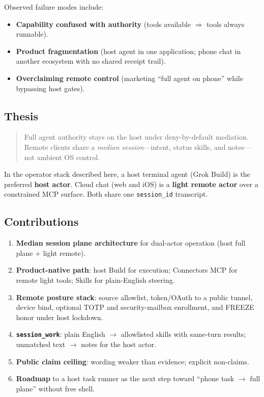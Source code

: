 \documentclass[11pt,a4paper]{article}
\begin{document}
Observed failure modes include:

\begin{itemize}[leftmargin=*]
  \item \textbf{Capability confused with authority}
        (tools available $\Rightarrow$ tools always runnable).
  \item \textbf{Product fragmentation}
        (host agent in one application; phone chat in another ecosystem with no
        shared receipt trail).
  \item \textbf{Overclaiming remote control}
        (marketing ``full agent on phone'' while bypassing host gates).
\end{itemize}

\subsection{Thesis}

\begin{quote}
Full agent authority stays on the host under deny-by-default mediation.
Remote clients share a \emph{median session}---intent, status skills, and
notes---not ambient OS control.
\end{quote}

In the operator stack described here, a host terminal agent (Grok Build) is the
preferred \textbf{host actor}. Cloud chat (web and iOS) is a \textbf{light remote
actor} over a constrained MCP surface. Both share one \texttt{session\_id}
transcript.

\subsection{Contributions}

\begin{enumerate}[leftmargin=*]
  \item \textbf{Median session plane architecture} for dual-actor operation
        (host full plane + light remote).
  \item \textbf{Product-native path}: host Build for execution; Connectors MCP for
        remote light tools; Skills for plain-English steering.
  \item \textbf{Remote posture stack}: source allowlist, token/OAuth to a public
        tunnel, device bind, optional TOTP and security-mailbox enrollment, and
        FREEZE honor under host lockdown.
  \item \textbf{\texttt{session\_work}}: plain English $\rightarrow$ allowlisted
        skills with same-turn results; unmatched text $\rightarrow$ notes for the
        host actor.
  \item \textbf{Public claim ceiling}: wording weaker than evidence; explicit
        non-claims.
  \item \textbf{Roadmap} to a host task runner as the next step toward
        ``phone task $\rightarrow$ full plane'' without free shell.
\end{enumerate}
\end{document}
